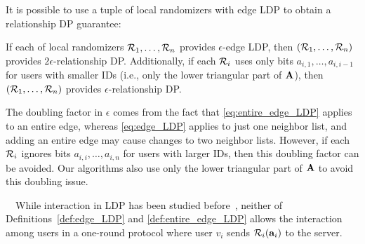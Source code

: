 It is possible to use
a tuple of local randomizers with edge LDP to obtain a relationship DP guarantee:
\begin{proposition}  
\label{prop:edge_LDP_entire_edge_LDP} 
  If 
  each 
  of local randomizers $\mathcal{R}_1, \ldots, \mathcal{R}_n$ 
  provides 
  $\epsilon$-edge LDP, then $(\mathcal{R}_1, \ldots, \mathcal{R}_n)$ provides 
  $2\epsilon$-relationship DP. 
  Additionally, if each $\mathcal{R}_i$ uses only bits $a_{i,1}, \ldots, a_{i,i-1}$ for users with smaller IDs (i.e., only the lower triangular part of $\mathbf{A}$), then $(\mathcal{R}_1, \ldots, \mathcal{R}_n)$ provides 
  $\epsilon$-relationship DP. 
\end{proposition}
The doubling factor in $\epsilon$ comes from the fact that 
\eqref{eq:entire_edge_LDP} applies to an entire edge, whereas
\eqref{eq:edge_LDP} applies to just one neighbor list, 
and 
adding an entire
edge may cause changes to two neighbor lists. 
However, 
if 
each $\mathcal{R}_i$ ignores
bits $a_{i,i}, \ldots, a_{i,n}$ for users with larger IDs, 
then this doubling
factor can be avoided. 
Our algorithms also use only the lower triangular part of $\mathbf{A}$ to avoid this doubling issue.

\smallskip
{}~~While interaction in LDP has been studied before~\cite{Joseph_SODA20}, neither of Definitions~\ref{def:edge_LDP} and \ref{def:entire_edge_LDP} 
allows the interaction among users in a one-round protocol where 
user $v_i$ sends $\mathcal{R}_i(\mathbf{a}_i)$ to the server. 

